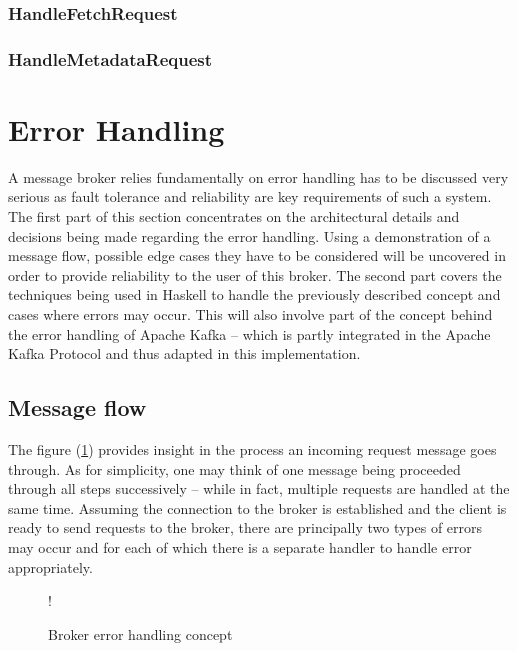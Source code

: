 \subsubsection{HandleFetchRequest}
\label{subsec:broker-api-fetchrequest}

\subsubsection{HandleMetadataRequest}

\section{Error Handling}
\label{sec:broker-error-handling}

A message broker relies fundamentally on error handling has to be discussed very
serious as fault tolerance and reliability are key requirements of such a
system. The first part of this section concentrates on the architectural details
and decisions being made regarding the error handling. Using a demonstration of
a message flow, possible edge cases they have to be considered will be uncovered
in order to provide reliability to the user of this broker. The second part
covers the techniques being used in Haskell to handle the previously described
concept and cases where errors may occur. This will also involve part of the
concept behind the error handling of Apache Kafka -- which is partly integrated
in the Apache Kafka Protocol and thus adapted in this implementation.

\subsection{Message flow}

The figure (\ref{fig:broker-error-activity}) provides insight in the process an
incoming request message goes through. As for simplicity, one may think of one
message being proceeded through all steps successively -- while in fact,
multiple requests are handled at the same time. Assuming the connection to the
broker is established and the client is ready to send requests to the broker,
there are principally two types of errors may occur and for each of which there
is a separate handler to handle error appropriately.

\begin{figure}[H]
  \centering
   {!} {
    
  }
  \caption{Broker error handling concept}
  \label{fig:broker-error-activity}
\end{figure}

